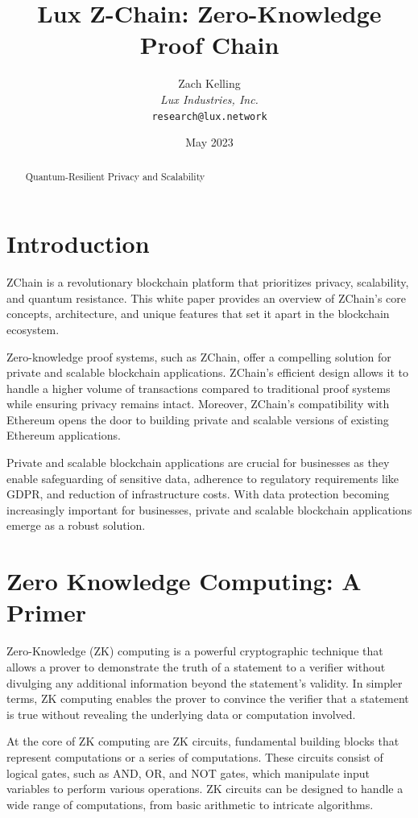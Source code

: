 \documentclass[11pt]{article}
\title{Lux Z-Chain: Zero-Knowledge Proof Chain}
\author{Zach Kelling\\\textit{Lux Industries, Inc.}\\\texttt{research@lux.network}}
\date{May 2023}
\begin{document}
\luxcoverpage

\begin{abstract}
Quantum-Resilient Privacy and Scalability
\end{abstract}

\tableofcontents
\newpage


\section{Introduction}

ZChain is a revolutionary blockchain platform that prioritizes privacy, scalability, and quantum resistance. This white paper provides an overview of ZChain's core concepts, architecture, and unique features that set it apart in the blockchain ecosystem.


Zero-knowledge proof systems, such as ZChain, offer a compelling solution for private and scalable blockchain applications. ZChain's efficient design allows it to handle a higher volume of transactions compared to traditional proof systems while ensuring privacy remains intact. Moreover, ZChain's compatibility with Ethereum opens the door to building private and scalable versions of existing Ethereum applications.


Private and scalable blockchain applications are crucial for businesses as they enable safeguarding of sensitive data, adherence to regulatory requirements like GDPR, and reduction of infrastructure costs. With data protection becoming increasingly important for businesses, private and scalable blockchain applications emerge as a robust solution.


\section{Zero Knowledge Computing: A Primer}

Zero-Knowledge (ZK) computing is a powerful cryptographic technique that allows a prover to demonstrate the truth of a statement to a verifier without divulging any additional information beyond the statement's validity. In simpler terms, ZK computing enables the prover to convince the verifier that a statement is true without revealing the underlying data or computation involved.


At the core of ZK computing are ZK circuits, fundamental building blocks that represent computations or a series of computations. These circuits consist of logical gates, such as AND, OR, and NOT gates, which manipulate input variables to perform various operations. ZK circuits can be designed to handle a wide range of computations, from basic arithmetic to intricate algorithms.
\end{document}
